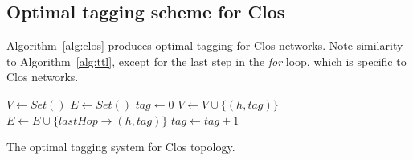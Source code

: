 \begin{appendices}
\section{Optimal tagging scheme for Clos}
\label{sec:clos_optimal}

Algorithm~\ref{alg:clos} produces optimal tagging for Clos networks. Note
similarity to Algorithm~\ref{alg:ttl}, except for the last step in the {\em for}
loop, which is specific to Clos networks.

\begin{algorithm}
	\small
	$V \gets Set()$\;
	$E \gets Set()$\; 
	 {
		$tag \gets 0$\;
		 {
			$V \gets V \cup \{(h, tag)\}$\;
			$E \gets E \cup \{lastHop\rightarrow(h, tag)\}$\;
			 {
				$tag \gets tag+1$\;
			}
		}
	}
	\;
    \caption{The optimal tagging system for Clos topology.}
	\label{alg:clos}
\end{algorithm}
\end{appendices}
